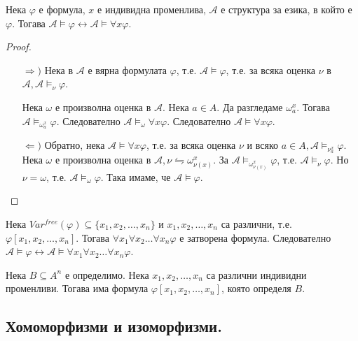 \documentclass{article}
\def\Proofs{1}
\begin{document}
\begin{claim}
Нека $\varphi$ е формула, $x$ е индивидна променлива, $\mathcal{A}$ е структура за езика, в който е $\varphi$. Тогава $\mathcal{A} \models \varphi \longleftrightarrow \mathcal{A} \models \forall x \varphi$.


\ifcase\Proofs\or
\begin{proof}
$\ $
\begin{itemize}
\item[$\Rightarrow)$] Нека в $\mathcal{A}$ е вярна формулата $\varphi$, т.е. $\mathcal{A} \models \varphi$, т.е. за всяка оценка $\nu$ в $\mathcal{A}, \mathcal{A} \models_\nu \varphi$.

Нека $\omega$ е произволна оценка в $\mathcal{A}$. Нека $a \in A$. Да разгледаме $\omega^x_a$. Тогава $\mathcal{A} \models_{\omega^x_a} \varphi$. Следователно $\mathcal{A} \models_\omega \forall x \varphi$. Следователно $\mathcal{A} \models \forall x \varphi$.
\item[$\Leftarrow)$] Обратно, нека $\mathcal{A} \models \forall x \varphi$, т.е. за всяка оценка $\nu$ и всяко $a \in A, \mathcal{A} \models_{\nu^x_a} \varphi$. Нека $\omega$ е произволна оценка в $\mathcal{A}, \nu \leftrightharpoons \omega^x_{\nu(x)}$. За $\mathcal{A} \models_{\omega^x_{\nu(x)}} \varphi$, т.е. $\mathcal{A} \models_\nu \varphi$. Но $\nu = \omega$, т.е. $\mathcal{A} \models_\omega \varphi$. Така имаме, че $\mathcal{A} \models \varphi$.
\end{itemize}

\end{proof} 
\fi

\begin{conseq}
Нека $Var^{free}(\varphi) \subseteq \{x_1, x_2, \ldots, x_n\}$ и $x_1, x_2, \ldots, x_n$ са различни, т.е. $\varphi[x_1, x_2, \ldots, x_n]$. Тогава $\forall x_1\forall x_2\ldots\forall x_n\varphi$ е затворена формула. Следователно $\mathcal{A} \models \varphi \longleftrightarrow \mathcal{A} \models \forall x_1\forall x_2\ldots\forall x_n\varphi$.
\end{conseq}

\end{claim}

\begin{claim}
Нека $B \subseteq A^n$ е определимо. Нека $x_1, x_2, \ldots, x_n$ са различни индивидни променливи. Тогава има формула $\varphi[x_1, x_2, \ldots, x_n]$, която определя $B$.
\end{claim}

\subsection*{Хомоморфизми и изоморфизми.}
\end{document}
